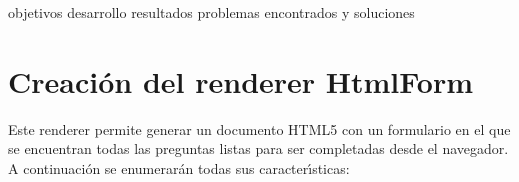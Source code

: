 

objetivos
desarrollo
resultados
problemas encontrados y soluciones


\section{Creaci\'on del renderer HtmlForm}
\label{3:sec2}

Este renderer permite generar un documento HTML5 con un formulario en el que se encuentran todas las
preguntas listas para ser completadas desde el navegador. A continuaci\'on se enumerar\'an todas sus 
caracter\'{\i}sticas:

